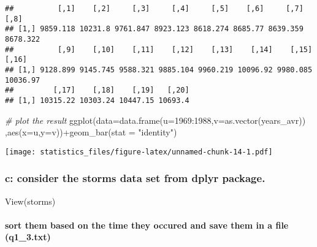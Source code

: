 \documentclass[
]{article}
\newenvironment{Shaded}{\begin{snugshade}}{\end{snugshade}}
\newcommand{\AttributeTok}[1]{\textcolor[rgb]{0.77,0.63,0.00}{#1}}
\newcommand{\CommentTok}[1]{\textcolor[rgb]{0.56,0.35,0.01}{\textit{#1}}}
\newcommand{\DecValTok}[1]{\textcolor[rgb]{0.00,0.00,0.81}{#1}}
\newcommand{\FunctionTok}[1]{\textcolor[rgb]{0.00,0.00,0.00}{#1}}
\newcommand{\NormalTok}[1]{#1}
\newcommand{\OtherTok}[1]{\textcolor[rgb]{0.56,0.35,0.01}{#1}}
\newcommand{\SpecialCharTok}[1]{\textcolor[rgb]{0.00,0.00,0.00}{#1}}
\newcommand{\StringTok}[1]{\textcolor[rgb]{0.31,0.60,0.02}{#1}}
\begin{document}
\begin{verbatim}
##          [,1]    [,2]     [,3]     [,4]     [,5]    [,6]     [,7]     [,8]
## [1,] 9859.118 10231.8 9761.847 8923.123 8618.274 8685.77 8639.359 8678.322
##          [,9]    [,10]    [,11]    [,12]    [,13]    [,14]    [,15]    [,16]
## [1,] 9128.899 9145.745 9588.321 9885.104 9960.219 10096.92 9980.085 10036.97
##         [,17]    [,18]    [,19]   [,20]
## [1,] 10315.22 10303.24 10447.15 10693.4
\end{verbatim}

\begin{Shaded}
\begin{Highlighting}[]
\CommentTok{\# plot the result}
\FunctionTok{ggplot}\NormalTok{(}\AttributeTok{data=}\FunctionTok{data.frame}\NormalTok{(}\AttributeTok{u=}\DecValTok{1969}\SpecialCharTok{:}\DecValTok{1988}\NormalTok{,}\AttributeTok{v=}\FunctionTok{as.vector}\NormalTok{(years\_avr))}
\NormalTok{       ,}\FunctionTok{aes}\NormalTok{(}\AttributeTok{x=}\NormalTok{u,}\AttributeTok{y=}\NormalTok{v))}\SpecialCharTok{+}\FunctionTok{geom\_bar}\NormalTok{(}\AttributeTok{stat =} \StringTok{"identity"}\NormalTok{)}
\end{Highlighting}
\end{Shaded}

\texttt{[image: statistics\_files/figure-latex/unnamed-chunk-14-1.pdf]}

\hypertarget{c-consider-the-storms-data-set-from-dplyr-package.}{%
\subsubsection{c: consider the storms data set from dplyr
package.}\label{c-consider-the-storms-data-set-from-dplyr-package.}}

\begin{Shaded}
\begin{Highlighting}[]
\FunctionTok{View}\NormalTok{(storms)}
\end{Highlighting}
\end{Shaded}

\hypertarget{sort-them-based-on-the-time-they-occured-and-save-them-in-a-file-q1_3.txt}{%
\paragraph{sort them based on the time they occured and save them in a
file
(q1\_3.txt)}\label{sort-them-based-on-the-time-they-occured-and-save-them-in-a-file-q1_3.txt}}

\begin{Shaded}
\end{Shaded}
\end{document}
